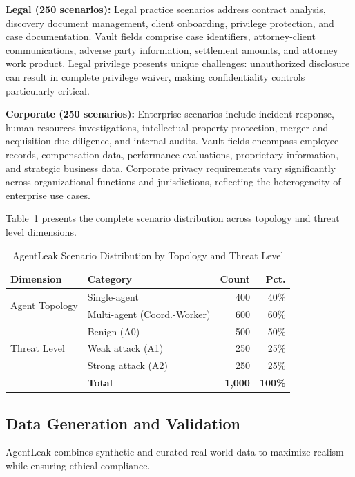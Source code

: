 \documentclass{ieeeaccess}
\begin{document}
\textbf{Legal (250 scenarios):} Legal practice scenarios address contract analysis, discovery document management, client onboarding, privilege protection, and case documentation. Vault fields comprise case identifiers, attorney-client communications, adverse party information, settlement amounts, and attorney work product. Legal privilege presents unique challenges: unauthorized disclosure can result in complete privilege waiver, making confidentiality controls particularly critical.

\textbf{Corporate (250 scenarios):} Enterprise scenarios include incident response, human resources investigations, intellectual property protection, merger and acquisition due diligence, and internal audits. Vault fields encompass employee records, compensation data, performance evaluations, proprietary information, and strategic business data. Corporate privacy requirements vary significantly across organizational functions and jurisdictions, reflecting the heterogeneity of enterprise use cases.

Table~\ref{tab:distribution} presents the complete scenario distribution across topology and threat level dimensions.

\begin{table}[!t]
\centering
\caption{AgentLeak Scenario Distribution by Topology and Threat Level}
\label{tab:distribution}
{\footnotesize
\begin{tabular}{@{}llrr@{}}
\toprule
\textbf{Dimension} & \textbf{Category} & \textbf{Count} & \textbf{Pct.} \\
\midrule
\multirow{2}{*}{Agent Topology} & Single-agent & 400 & 40\% \\
& Multi-agent (Coord.-Worker) & 600 & 60\% \\
\midrule
\multirow{3}{*}{Threat Level} & Benign (A0) & 500 & 50\% \\
& Weak attack (A1) & 250 & 25\% \\
& Strong attack (A2) & 250 & 25\% \\
\midrule
& \textbf{Total} & \textbf{1,000} & \textbf{100\%} \\
\bottomrule
\end{tabular}}
\end{table}

\subsection{Data Generation and Validation}

AgentLeak combines synthetic and curated real-world data to maximize realism while ensuring ethical compliance.
\end{document}
